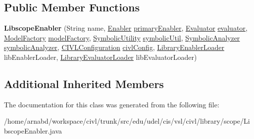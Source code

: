 \subsection*{Public Member Functions}
\begin{DoxyCompactItemize}
\item 
\hypertarget{classedu_1_1udel_1_1cis_1_1vsl_1_1civl_1_1library_1_1scope_1_1LibscopeEnabler_a40bbdea8d739fa892fb79521cf89537a}{}{\bfseries Libscope\+Enabler} (String name, \hyperlink{interfaceedu_1_1udel_1_1cis_1_1vsl_1_1civl_1_1kripke_1_1IF_1_1Enabler}{Enabler} \hyperlink{classedu_1_1udel_1_1cis_1_1vsl_1_1civl_1_1library_1_1common_1_1BaseLibraryEnabler_a1a2cc978c11d389f54863cad585bff44}{primary\+Enabler}, \hyperlink{interfaceedu_1_1udel_1_1cis_1_1vsl_1_1civl_1_1semantics_1_1IF_1_1Evaluator}{Evaluator} \hyperlink{classedu_1_1udel_1_1cis_1_1vsl_1_1civl_1_1library_1_1common_1_1BaseLibraryEnabler_aef497c183004fbfa8dd113033c0c4275}{evaluator}, \hyperlink{interfaceedu_1_1udel_1_1cis_1_1vsl_1_1civl_1_1model_1_1IF_1_1ModelFactory}{Model\+Factory} \hyperlink{classedu_1_1udel_1_1cis_1_1vsl_1_1civl_1_1library_1_1common_1_1LibraryComponent_ac38a7c7971f70f8c969e55538a17f016}{model\+Factory}, \hyperlink{interfaceedu_1_1udel_1_1cis_1_1vsl_1_1civl_1_1dynamic_1_1IF_1_1SymbolicUtility}{Symbolic\+Utility} \hyperlink{classedu_1_1udel_1_1cis_1_1vsl_1_1civl_1_1library_1_1common_1_1LibraryComponent_a18214426269e7c352f4926264837c8a6}{symbolic\+Util}, \hyperlink{interfaceedu_1_1udel_1_1cis_1_1vsl_1_1civl_1_1semantics_1_1IF_1_1SymbolicAnalyzer}{Symbolic\+Analyzer} \hyperlink{classedu_1_1udel_1_1cis_1_1vsl_1_1civl_1_1library_1_1common_1_1LibraryComponent_a7a1213c02b2d29a79f550c7090594967}{symbolic\+Analyzer}, \hyperlink{classedu_1_1udel_1_1cis_1_1vsl_1_1civl_1_1config_1_1IF_1_1CIVLConfiguration}{C\+I\+V\+L\+Configuration} \hyperlink{classedu_1_1udel_1_1cis_1_1vsl_1_1civl_1_1library_1_1common_1_1LibraryComponent_a223e603cab7a909db88f49c256b2ce98}{civl\+Config}, \hyperlink{interfaceedu_1_1udel_1_1cis_1_1vsl_1_1civl_1_1kripke_1_1IF_1_1LibraryEnablerLoader}{Library\+Enabler\+Loader} lib\+Enabler\+Loader, \hyperlink{interfaceedu_1_1udel_1_1cis_1_1vsl_1_1civl_1_1semantics_1_1IF_1_1LibraryEvaluatorLoader}{Library\+Evaluator\+Loader} lib\+Evaluator\+Loader)\label{classedu_1_1udel_1_1cis_1_1vsl_1_1civl_1_1library_1_1scope_1_1LibscopeEnabler_a40bbdea8d739fa892fb79521cf89537a}

\end{DoxyCompactItemize}
\subsection*{Additional Inherited Members}


The documentation for this class was generated from the following file\+:\begin{DoxyCompactItemize}
\item 
/home/arnabd/workspace/civl/trunk/src/edu/udel/cis/vsl/civl/library/scope/Libscope\+Enabler.\+java\end{DoxyCompactItemize}
